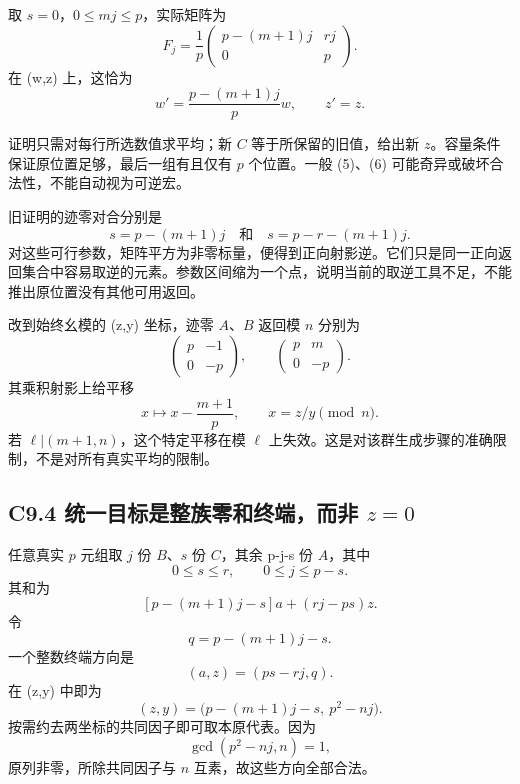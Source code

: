 {取} {\ensuremath{s=0}，\ensuremath{0\le mj\le p}，实际矩阵为} \[
F_j=\frac1p
\begin{pmatrix}
p-(m+1)j&rj\\
0&p
\end{pmatrix}.
\tag{C9.7}
\] {在} {(w,z)} {上，这恰为} \[
w'=\frac{p-(m+1)j}{p}w,\qquad z'=z.
\]

{证明只需对每行所选数值求平均；新} {\ensuremath{C}} {等于所保留的旧值，给出新} {\ensuremath{z}。容量条件保证原位置足够，最后一组有且仅有} {\ensuremath{p}} {个位置。一般} {(5)、(6)} {可能奇异或破坏合法性，不能自动视为可逆宏。}

{旧证明的迹零对合分别是} \[
s=p-(m+1)j\quad\text{和}\quad
s=p-r-(m+1)j.
\tag{C9.8}
\] {对这些可行参数，矩阵平方为非零标量，便得到正向射影逆。它们只是同一正向返回集合中容易取逆的元素。参数区间缩为一个点，说明当前的取逆工具不足，不能推出原位置没有其他可用返回。}

{改到始终幺模的} {(z,y)} {坐标，迹零} {\ensuremath{A}、\ensuremath{B}} {返回模} {\ensuremath{n}} {分别为} \[
\begin{pmatrix}p&-1\\0&-p\end{pmatrix},
\qquad
\begin{pmatrix}p&m\\0&-p\end{pmatrix}.
\] {其乘积射影上给平移} \[
\boxed{x\longmapsto x-\frac{m+1}{p},\qquad x=z/y\pmod n.}
\tag{C9.9}
\] {若} {\ensuremath{\ell |(m+1,n)}，这个特定平移在模} {\ensuremath{\ell }} {上失效。这是对该群生成步骤的准确限制，不是对所有真实平均的限制。}

\subsection*{\texorpdfstring{{C9.4} {统一目标是整族零和终端，而非} {\ensuremath{z=0}}}{C9.4 统一目标是整族零和终端，而非 }}\label{C9-h64}

{任意真实} {\ensuremath{p}} {元组取} {\ensuremath{j}} {份} {\ensuremath{B}、\ensuremath{s}} {份} {\ensuremath{C}，其余} {p-j-s} {份} {\ensuremath{A}，其中} \[
0\le s\le r,\qquad0\le j\le p-s.
\] {其和为} \[
[p-(m+1)j-s]a+(rj-ps)z.
\] {令} \[
q=p-(m+1)j-s.
\] {一个整数终端方向是} \[
(a,z)=(ps-rj,q).
\] {在} {(z,y)} {中即为} \[
\boxed{(z,y)=
\bigl(p-(m+1)j-s,\ p^2-nj\bigr).}
\tag{C9.10}
\] {按需约去两坐标的共同因子即可取本原代表。因为} \[
\gcd(p^2-nj,n)=1,
\] {原列非零，所除共同因子与} {\ensuremath{n}} {互素，故这些方向全部合法。}

